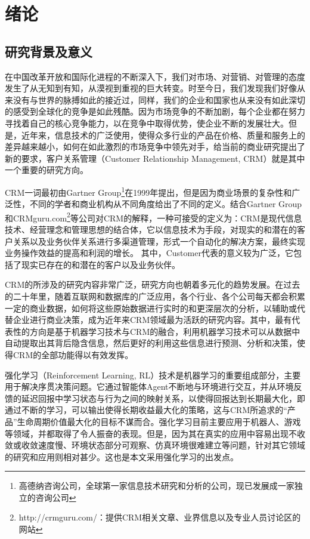 \chapter{绪论}

\section{研究背景及意义}

 
在中国改革开放和国际化进程的不断深入下，我们对市场、对营销、对管理的态度发生了从无知到有知，从漠视到重视的巨大转变。时至今日，我们发现我们好像从来没有与世界的脉搏如此的接近过，同样，我们的企业和国家也从来没有如此深切的感受到全球化的竞争是如此残酷。因为市场竞争的不断加剧，每个企业都在努力寻找着自己的核心竞争能力，以在竞争中取得优势，使企业不断的发展壮大。但是，近年来，信息技术的广泛使用，使得众多行业的产品在价格、质量和服务上的差异越来越小，如何在如此激烈的市场竞争中领先对手，给当前的商业研究提出了新的要求，客户关系管理（Customer Relationship Management, CRM）就是其中一个重要的研究方向。

CRM一词最初由Gartner Group\footnote{高德纳咨询公司，全球第一家信息技术研究和分析的公司，现已发展成一家独立的咨询公司}在1999年提出，但是因为商业场景的复杂性和广泛性，不同的学者和商业机构从不同角度给出了不同的定义。结合Gartner Group和CRMguru.com\footnote{http://crmguru.com/：提供CRM相关文章、业界信息以及专业人员讨论区的网站}等公司对CRM的解释，一种可接受的定义为：CRM是现代信息技术、经营理念和管理思想的结合体，它以信息技术为手段，对现实的和潜在的客户关系以及业务伙伴关系进行多渠道管理，形式一个自动化的解决方案，最终实现业务操作效益的提高和利润的增长\citep{客户关系管理丁建石}。
其中，Customer代表的意义较为广泛，它包括了现实已存在的和潜在的客户以及业务伙伴。

CRM的所涉及的研究内容非常广泛，研究方向也朝着多元化的趋势发展\citep{王广宇2013客户关系管理}。在过去的二十年里，随着互联网和数据库的广泛应用，各个行业、各个公司每天都会积累一定的商业数据，如何将这些原始数据进行实时的和更深层次的分析，以辅助或代替企业进行商业决策，成为近年来CRM领域最为活跃的研究内容。其中，最有代表性的方向是基于机器学习技术与CRM的融合，利用机器学习技术可以从数据中自动提取出其背后隐含信息，然后更好的利用这些信息进行预测、分析和决策，使得CRM的全部功能得以有效发挥。

强化学习（Reinforcement Learning, RL）技术是机器学习的重要组成部分，主要用于解决序贯决策问题。它通过智能体Agent不断地与环境进行交互，并从环境反馈的延迟回报中学习状态与行为之间的映射关系，以使得回报达到长期最大化，即通过不断的学习，可以输出使得长期收益最大化的策略，这与CRM所追求的“产品”生命周期价值最大化的目标不谋而合。强化学习目前主要应用于机器人、游戏等领域，并都取得了令人振奋的表现。但是，因为其在真实的应用中容易出现不收敛或收敛速度慢、环境状态部分可观察、仿真环境很难建立等问题，针对其它领域的研究和应用则相对甚少。这也是本文采用强化学习的出发点。

